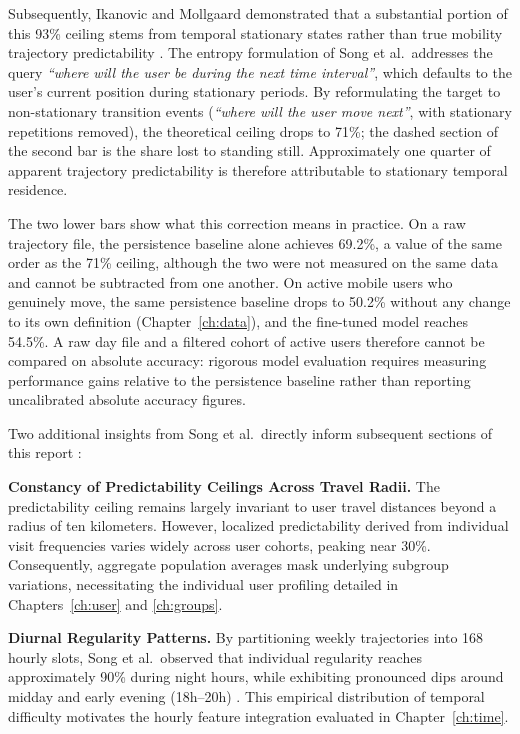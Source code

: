 Subsequently, Ikanovic and Mollgaard demonstrated that a substantial portion of this 93\% ceiling stems from temporal stationary states rather than true mobility trajectory predictability \textbf{\cite{ikanovic2017alternative}}. The entropy formulation of Song et al.\ addresses the query \emph{``where will the user be during the next time interval''}, which defaults to the user's current position during stationary periods. By reformulating the target to non-stationary transition events (\emph{``where will the user move next''}, with stationary repetitions removed), the theoretical ceiling drops to 71\%; the dashed section of the second bar is the share lost to standing still. Approximately one quarter of apparent trajectory predictability is therefore attributable to stationary temporal residence.

The two lower bars show what this correction means in practice. On a raw trajectory file, the persistence baseline alone achieves 69.2\%, a value of the same order as the 71\% ceiling, although the two were not measured on the same data and cannot be subtracted from one another. On active mobile users who genuinely move, the same persistence baseline drops to 50.2\% without any change to its own definition (Chapter~\ref{ch:data}), and the fine-tuned model reaches 54.5\%. A raw day file and a filtered cohort of active users therefore cannot be compared on absolute accuracy: rigorous model evaluation requires measuring performance gains relative to the persistence baseline rather than reporting uncalibrated absolute accuracy figures.

Two additional insights from Song et al.\ directly inform subsequent sections of this report \textbf{\cite{song2010limits}}:

\textbf{Constancy of Predictability Ceilings Across Travel Radii.} The predictability ceiling remains largely invariant to user travel distances beyond a radius of ten kilometers. However, localized predictability derived from individual visit frequencies varies widely across user cohorts, peaking near 30\%. Consequently, aggregate population averages mask underlying subgroup variations, necessitating the individual user profiling detailed in Chapters~\ref{ch:user} and \ref{ch:groups}.

\textbf{Diurnal Regularity Patterns.} By partitioning weekly trajectories into 168 hourly slots, Song et al.\ observed that individual regularity reaches approximately 90\% during night hours, while exhibiting pronounced dips around midday and early evening (18h--20h) \textbf{\cite{song2010limits}}. This empirical distribution of temporal difficulty motivates the hourly feature integration evaluated in Chapter~\ref{ch:time}.

